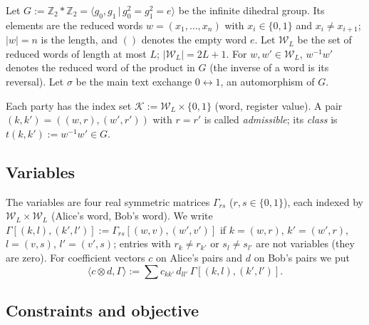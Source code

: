 \documentclass[aps,pra,onecolumn,notitlepage,superscriptaddress,longbibliography,nofootinbib,11pt]{revtex4-2}
\theoremstyle{remark}
\newcommand{\ZZ}{\mathbb{Z}}
\newcommand{\cW}{\mathcal{W}}
\newcommand{\cK}{\mathcal{K}}
\begin{document}
Let $G:=\ZZ_2*\ZZ_2=\langle g_0,g_1\,|\,g_0^2=g_1^2=e\rangle$ be the infinite dihedral group. Its elements are the reduced words $w=(x_1,\dots,x_n)$ with $x_i\in\{0,1\}$ and $x_i\neq x_{i+1}$; $|w|=n$ is the length, and $()$ denotes the empty word $e$. Let $\cW_L$ be the set of reduced words of length at most $L$; $|\cW_L|=2L+1$. For $w,w'\in\cW_L$, $w^{-1}w'$ denotes the reduced word of the product in $G$ (the inverse of a word is its reversal). Let $\sigma$ be the main text exchange $0\leftrightarrow1$, an automorphism of $G$.

Each party has the index set $\cK:=\cW_L\times\{0,1\}$ (word, register value). A pair $(k,k')=((w,r),(w',r'))$ with $r=r'$ is called \emph{admissible}; its \emph{class} is $t(k,k'):=w^{-1}w'\in G$.

\subsection{Variables}

The variables are four real symmetric matrices $\Gamma_{rs}$ ($r,s\in\{0,1\}$), each indexed by $\cW_L\times\cW_L$ (Alice's word, Bob's word). We write $\Gamma[(k,l),(k',l')]:=\Gamma_{rs}[(w,v),(w',v')]$ if $k=(w,r)$, $k'=(w',r)$, $l=(v,s)$, $l'=(v',s)$; entries with $r_k\neq r_{k'}$ or $s_l\neq s_{l'}$ are not variables (they are zero). For coefficient vectors $c$ on Alice's pairs and $d$ on Bob's pairs we put
\begin{equation}
\langle c\otimes d,\Gamma\rangle:=\sum c_{kk'}\,d_{ll'}\,\Gamma[(k,l),(k',l')] .
\end{equation}

\subsection{Constraints and objective}
\end{document}
